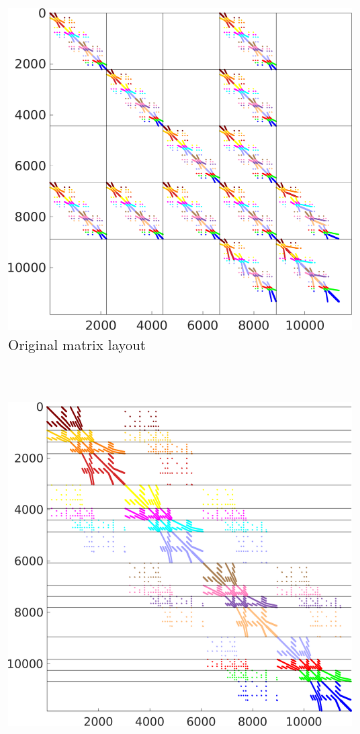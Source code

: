 \begin{figure}%
  \centering%
  \begin{subfigure}[t]{0.49\textwidth}%
    \centering%
    \includegraphics[width=\textwidth]{images/implementation/16_original_matrix.png}
    \caption{Original matrix layout}%
    \label{fig:16_original_matrix}%
  \end{subfigure}
  \,
  \begin{subfigure}[t]{0.49\textwidth}%
    \centering%
    \includegraphics[width=\textwidth]{images/implementation/16_reordered_matrix.png}

\end{subfigure}
\end{figure}
